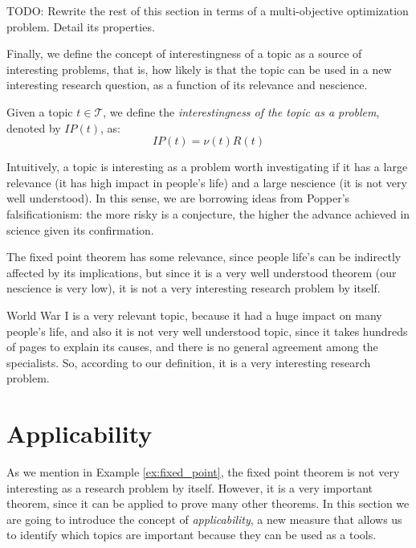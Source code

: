 {\color{red} TODO: Rewrite the rest of this section in terms of a multi-objective optimization problem. Detail its properties.}

Finally, we define the concept of interestingness of a topic as a source of interesting problems, that is, how likely is that the topic can be used in a new interesting research question, as a function of its relevance and nescience.

\begin{definition}
Given a topic $t \in \mathcal{T}$, we define the \emph{interestingness of the topic as a problem}, denoted by $IP(t)$, as:
\[
IP(t) = \nu(t) R(t)
\]
\end{definition}

Intuitively, a topic is interesting as a problem worth investigating if it has a large relevance (it has high impact in people's life) and a large nescience (it is not very well understood). In this sense, we are borrowing ideas from Popper's falsificationism: the more risky is a conjecture, the higher the advance achieved in science given its confirmation.

\begin{example}
\label{ex:fixed_point}
The fixed point theorem has some relevance, since people life's can be indirectly affected by its implications, but since it is a very well understood theorem (our nescience is very low), it is not a very interesting research problem by itself.

World War I is a very relevant topic, because it had a huge impact on many people's life, and also it is not very well understood topic, since it takes hundreds of pages to explain its causes, and there is no general agreement among the specialists. So, according to our definition, it is a very interesting research problem.
\end{example}

%
%

\section{Applicability}

As we mention in Example \ref{ex:fixed_point}, the fixed point theorem is not very interesting as a research problem by itself. However, it is a very important theorem, since it can be applied to prove many other theorems. In this section we are going to introduce the concept of \emph{applicability}, a new measure that allows us to identify which topics are important because they can be used as a tools.

